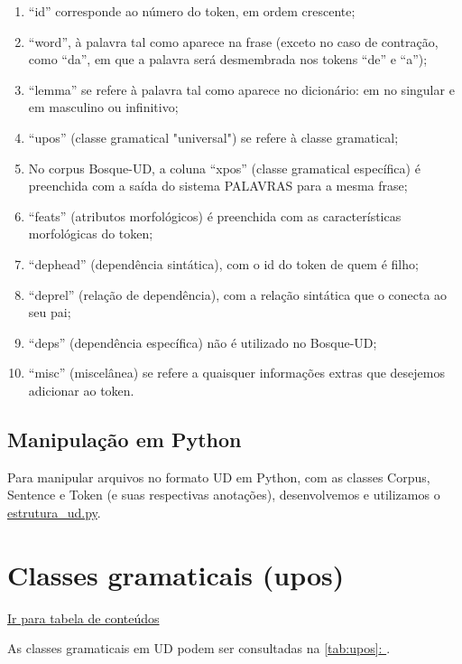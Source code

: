\documentclass[output=paper,colorlinks,citecolor=brown]{langscibook}
\newcommand*{\fullref}[1]{\hyperref[{#1}]{\autoref*{#1}: \nameref*{#1}}} %
\begin{document}
\begin{enumerate}
    \item “id” corresponde ao número do token, em ordem crescente;
    \item “word”, à palavra tal como aparece na frase (exceto no caso de contração, como “da”, em que a palavra será desmembrada nos tokens “de” e “a”);
    \item “lemma” se refere à palavra tal como aparece no dicionário: em no singular e em masculino ou infinitivo;
    \item “upos” (classe gramatical "universal") se refere à classe gramatical;
    \item No corpus Bosque-UD, a coluna “xpos” (classe gramatical específica) é preenchida com a saída do sistema PALAVRAS para a mesma frase;
    \item “feats” (atributos morfológicos) é preenchida com as características morfológicas do token;
    \item “dephead” (dependência sintática), com o id do token de quem é filho;
    \item “deprel” (relação de dependência), com a relação sintática que o conecta ao seu pai;
    \item “deps” (dependência específica) não é utilizado no Bosque-UD;
    \item “misc” (miscelânea) se refere a quaisquer informações extras que desejemos adicionar ao token.
\end{enumerate}{}

\section{Manipulação em Python}\label{sec:python}



Para manipular arquivos no formato UD em Python, com as classes Corpus, Sentence e Token (e suas respectivas anotações), desenvolvemos e utilizamos o \href{https://github.com/alvelvis/ACDC-UD/blob/master/estrutura_ud.py}{estrutura\_ud.py}.

\chapter{Classes gramaticais (upos)}\label{sec:upos}

\hyperlink{toc}{Ir para tabela de conteúdos\\}



As classes gramaticais em UD podem ser consultadas na \fullref{tab:upos}.
\end{document}

